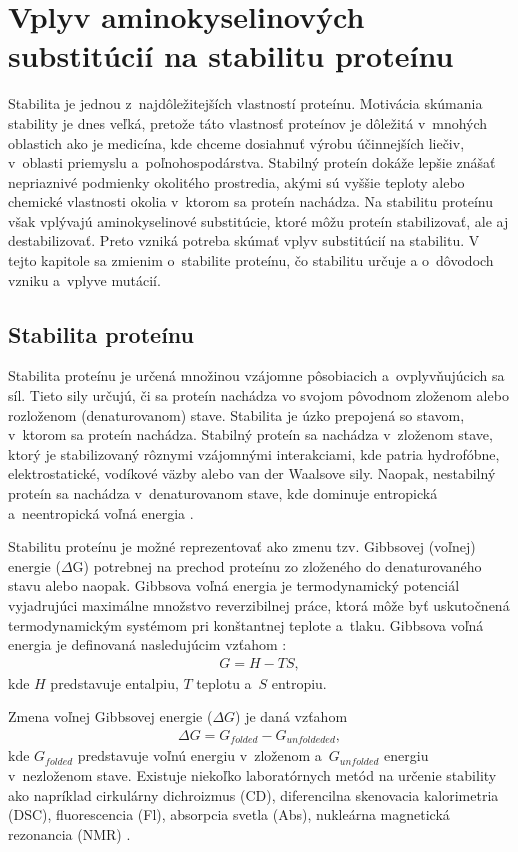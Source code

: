 \chapter{Vplyv aminokyselinových substitúcií na stabilitu proteínu}

Stabilita je jednou z~najdôležitejších vlastností proteínu. Motivácia skúmania stability je dnes veľká, pretože táto vlastnosť proteínov je dôležitá v~mnohých oblastich ako je medicína, kde chceme dosiahnuť výrobu účinnejších liečiv, v~oblasti priemyslu a~poľnohospodárstva. Stabilný proteín dokáže lepšie znášať nepriaznivé podmienky okolitého prostredia, akými sú vyššie teploty alebo chemické vlastnosti okolia v~ktorom sa proteín nachádza. Na stabilitu proteínu však vplývajú aminokyselinové substitúcie, ktoré môžu proteín stabilizovať, ale aj destabilizovať. Preto vzniká potreba skúmať vplyv substitúcií na stabilitu. V tejto kapitole sa zmienim o~stabilite proteínu, čo stabilitu určuje a o~dôvodoch vzniku a~vplyve mutácií.


\section{Stabilita proteínu}
Stabilita proteínu je určená množinou vzájomne pôsobiacich a~ovplyvňujúcich sa síl. Tieto sily určujú, či sa proteín nachádza vo svojom pôvodnom zloženom alebo rozloženom (denaturovanom) stave. Stabilita je úzko prepojená so stavom, v~ktorom sa proteín nachádza. Stabilný proteín sa nachádza v~zloženom stave, ktorý je stabilizovaný rôznymi vzájomnými interakciami, kde patria hydrofóbne, elektrostatické, vodíkové väzby alebo van der Waalsove sily. Naopak, nestabilný proteín sa nachádza v~denaturovanom stave, kde dominuje entropická a~neentropická voľná energia \cite{gromiha}.

Stabilitu proteínu je možné reprezentovať ako zmenu tzv. Gibbsovej (voľnej) energie ($\Delta$G) potrebnej na prechod proteínu zo zloženého do denaturovaného stavu alebo naopak. 
Gibbsova voľná energia je termodynamický potenciál vyjadrujúci maximálne množstvo reverzibilnej práce, ktorá môže byť uskutočnená termodynamickým systémom pri konštantnej teplote a~tlaku. Gibbsova voľná energia je definovaná nasledujúcim vzťahom \cite{gibbs}:
\begin{align}
	G = H - TS,
\end{align}
kde $H$ predstavuje entalpiu, $T$ teplotu a~$S$ entropiu.

Zmena voľnej Gibbsovej energie ($\Delta G$) je daná vzťahom
\begin{align}
	\Delta G = G_{folded} - G_{unfoldeded},
\end{align}
kde $G_{folded}$ predstavuje voľnú energiu v~zloženom a~$G_{unfolded}$ energiu v~nezloženom stave.
Existuje niekoľko laboratórnych metód na určenie stability ako napríklad cirkulárny dichroizmus (CD), diferencilna skenovacia kalorimetria (DSC), fluorescencia (Fl), absorpcia svetla (Abs), nukleárna magnetická rezonancia (NMR) \cite{gromiha}.

